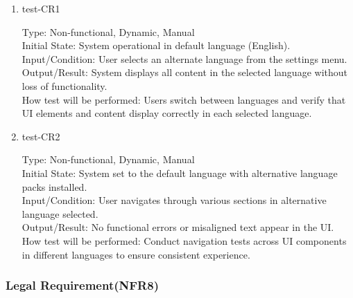 \documentclass[12pt, titlepage]{article}
\begin{document}
\begin{enumerate}
    \item{test-CR1\\} \label{test-CR1}
    
    Type: Non-functional, Dynamic, Manual\\
    
    Initial State: System operational in default language (English).\\
    
    Input/Condition: User selects an alternate language from the settings menu.\\
    
    Output/Result: System displays all content in the selected language without loss of functionality.\\
    
    How test will be performed: Users switch between languages and verify that UI elements and content display correctly in each selected language.

    \item{test-CR2\\} \label{test-CR2}
    
    Type: Non-functional, Dynamic, Manual\\
    
    Initial State: System set to the default language with alternative language packs installed.\\

    Input/Condition: User navigates through various sections in alternative language selected.\\
    
    Output/Result: No functional errors or misaligned text appear in the UI.\\
    
    How test will be performed: Conduct navigation tests across UI components in different languages to ensure consistent experience.
\end{enumerate}

\subsubsection{Legal Requirement(NFR8)} \label{section:4.2.8}
\end{document}
